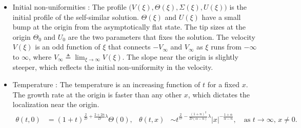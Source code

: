\documentclass[graybox]{svmult}
\begin{document}
\begin{itemize}
 \item Initial non-uniformities : The profile $\big(V(\xi),\Theta(\xi),\Sigma(\xi),U(\xi)\big)$ is the initial profile of the self-similar solution. $\Theta(\xi)$ and $U(\xi)$ have a small bump at the origin from the asymptotically flat state. The tip sizes at the origin $\Theta_0$ and $U_0$ are the two parameters that fixes the solution. The velocity $V(\xi)$ is an odd function of $\xi$ that connects $-V_\infty$ and $V_\infty$ as $\xi$ runs from $-\infty$ to $\infty$, where $V_\infty \triangleq \lim_{\xi \rightarrow \infty} V(\xi)$. The slope near the origin is slightly steeper, which reflects the initial non-uniformity in the velocity.
\item Temperature : The temperature is an increasing function of $t$ for a fixed $x$. The growth rate at the origin is faster than any other $x$, which dictates the localization near the origin.
\begin{align*}
 \theta(t,0) &= (1+t)^{\frac{2}{D} + \frac{2+2n}{D}\lambda}\Theta(0),&
 \theta(t,x) &\sim t^{\frac{2}{D} - \frac{(1+n)^2}{D(\alpha-n)}\lambda}|x|^{-\frac{1+\alpha}{\alpha-n}}, \quad \text{as $t \rightarrow \infty$, $x\ne0$.}
\end{align*}


\end{itemize}
\end{document}
